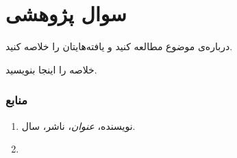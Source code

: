 \section{سوال پژوهشی }

\begin{question}
    درباره‌ی موضوع مطالعه کنید و یافته‌هایتان را خلاصه کنید.
\end{question}

\begin{answer}
    خلاصه را اینجا بنویسید.

    \subsubsection{منابع}

    \begin{enumerate}
        \item نویسنده، \textit{عنوان}، ناشر، سال.
        \item {}
    \end{enumerate}
\end{answer}
